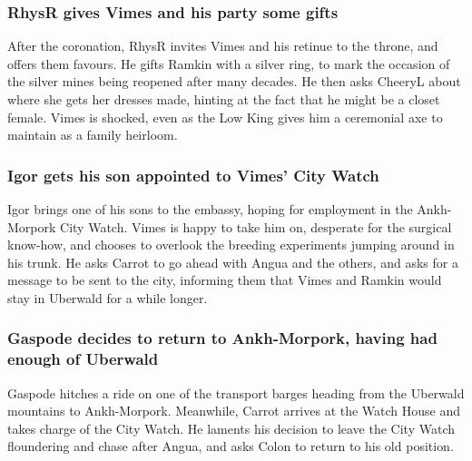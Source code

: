 \subsubsection{\Gls{RhysR} gives \Gls{Vimes} and his party some gifts}
After the coronation, \Gls{RhysR} invites \Gls{Vimes} and his retinue to the throne, and offers them
favours. He gifts \Gls{Ramkin} with a silver ring, to mark the occasion of the silver mines being
reopened after many decades. He then asks \Gls{CheeryL} about where she gets her dresses made,
hinting at the fact that he might be a closet female. \Gls{Vimes} is shocked, even as the Low King
gives him a ceremonial axe to maintain as a family heirloom.

\subsubsection{\Gls{Igor} gets his son appointed to \Gls{Vimes}' City Watch}
\Gls{Igor} brings one of his sons to the embassy, hoping for employment in the Ankh-Morpork City
Watch. \Gls{Vimes} is happy to take him on, desperate for the surgical know-how, and chooses to
overlook the breeding experiments jumping around in his trunk. He asks \Gls{Carrot} to go ahead with
\Gls{Angua} and the others, and asks for a message to be sent to the city, informing them that
\Gls{Vimes} and \Gls{Ramkin} would stay in Uberwald for a while longer.

\subsubsection{\Gls{Gaspode} decides to return to Ankh-Morpork, having had enough of Uberwald}
\Gls{Gaspode} hitches a ride on one of the transport barges heading from the Uberwald mountains to
Ankh-Morpork. Meanwhile, \Gls{Carrot} arrives at the Watch House and takes charge of the City
Watch. He laments his decision to leave the City Watch floundering and chase after \Gls{Angua}, and
asks \Gls{Colon} to return to his old position.